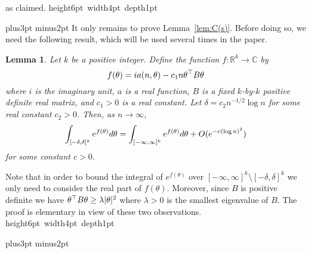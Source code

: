 \documentclass[12pt]{article}
\newcommand{\lab}[1]{\label{#1}}
\def\blackslug{\hbox{\kern1pt\vrule height6pt width4pt  depth1pt\kern1pt}}
\def\qed{\penalty 500\hbox{\quad\blackslug}\ifmmode\else\par
                                             \vskip4.5pt plus3pt minus2pt\fi}
\newtheorem{lemma}[thm]{Lemma}
\def\proof{\par\noindent{\bf Proof.\enspace}\rm}
\def\BC{{\mathbb C}}
\def\transpose{\top}
\def\vtheta{{\bf \theta}}
\newcommand{\real}{\ensuremath {\mathbb R} }
\begin{document}
as claimed.
\qed
%
%
It only remains to prove Lemma~\ref{lem:C(s)}. Before doing so, we need the following result, which will be used several times in the paper.
%
%
\begin{lemma}
\lab{lGauss}
Let $k$ be a positive integer. Define the function $f:\real^k\to\BC$ by
\[
f(\vtheta) = ia(n, \vtheta) -c_1 n \vtheta^\transpose B\vtheta
\]
where $i$ is the imaginary unit, 
$a$ is a real function, $B$ is a fixed $k$-by-$k$ positive
definite real matrix, and $c_1>0$ is a real constant. Let $\delta=c_2 n^{-1/2}\log n$ for some real constant $c_2>0$.
Then, as $n\to\infty$,
\[
\int_{[-\delta,\delta]^k} e^{f(\vtheta)} d\vtheta
=
\int_{[-\infty,\infty]^k} e^{f(\vtheta)} d\vtheta
+O(e^{-c(\log n)^2})
\]
for some constant $c>0$.
\end{lemma}
\proof
Note that in order to bound the integral of $e^{f(\theta)}$ over $[-\infty,\infty]^k\setminus [-\delta,\delta]^{k}$ we only need to consider the real part of $f(\theta)$. Moreover,
since $B$ is positive definite we have $\vtheta^\transpose B\vtheta \ge \lambda |\vtheta|^2$ where $\lambda>0$ is the smallest eigenvalue of $B$. The proof is elementary in view of these two observations.
\qed
\end{document}
